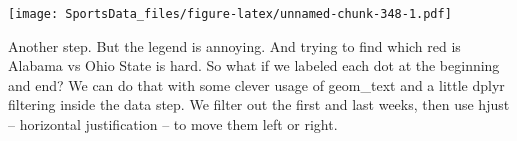 \documentclass[]{book}
\newenvironment{Shaded}{\begin{snugshade}}{\end{snugshade}}
\newcommand{\DataTypeTok}[1]{\textcolor[rgb]{0.13,0.29,0.53}{#1}}
\newcommand{\DecValTok}[1]{\textcolor[rgb]{0.00,0.00,0.81}{#1}}
\newcommand{\KeywordTok}[1]{\textcolor[rgb]{0.13,0.29,0.53}{\textbf{#1}}}
\newcommand{\NormalTok}[1]{#1}
\newcommand{\OperatorTok}[1]{\textcolor[rgb]{0.81,0.36,0.00}{\textbf{#1}}}
\newcommand{\StringTok}[1]{\textcolor[rgb]{0.31,0.60,0.02}{#1}}
\begin{document}
\begin{Shaded}
\end{Shaded}

\texttt{[image: SportsData\_files/figure-latex/unnamed-chunk-348-1.pdf]}

Another step. But the legend is annoying. And trying to find which red is Alabama vs Ohio State is hard. So what if we labeled each dot at the beginning and end? We can do that with some clever usage of geom\_text and a little dplyr filtering inside the data step. We filter out the first and last weeks, then use hjust -- horizontal justification -- to move them left or right.
\end{document}

